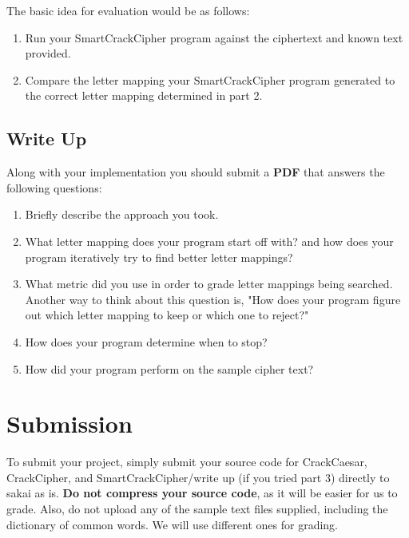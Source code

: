 \documentclass{article}
\begin{document}
\noindent The basic idea for evaluation would be as follows:
\begin{enumerate}
\item Run your SmartCrackCipher program against the ciphertext and known text provided.
\item Compare the letter mapping your SmartCrackCipher program generated to the correct letter mapping determined in part 2.
\end{enumerate}

\subsection{Write Up}
Along with your implementation you should submit a \textbf{PDF} that answers the following questions:
\begin{enumerate}
\item Briefly describe the approach you took.
\item What letter mapping does your program start off with? and how does your program iteratively try to find better letter mappings?
\item What metric did you use in order to grade letter mappings being searched. Another way to think about this question is, "How does your program figure out which letter mapping to keep or which one to reject?"
\item How does your program determine when to stop?
\item How did your program perform on the sample cipher text?
\end{enumerate}


\section{Submission}
To submit your project, simply submit your source code for CrackCaesar, CrackCipher, and SmartCrackCipher/write up (if you tried part 3) directly to sakai as is. \textbf{Do not compress your source code}, as it will be easier for us to grade. Also, do not upload any of the sample text files supplied, including the dictionary of common words. We will use different ones for grading.
\end{document}
